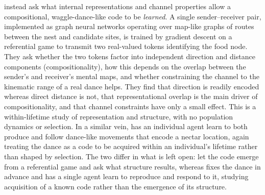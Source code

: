 \documentclass[11pt]{article}
\begin{document}
\citet{siregar2026emergent} instead ask what internal representations and
channel properties allow a compositional, waggle-dance-like code to be
\emph{learned}. A single sender--receiver pair, implemented as graph neural
networks operating over map-like graphs of routes between the nest and candidate
sites, is trained by gradient descent on a referential game to transmit two
real-valued tokens identifying the food node. They ask whether the two tokens
factor into independent direction and distance components (compositionality),
how this depends on the overlap between the sender's and receiver's mental maps,
and whether constraining the channel to the kinematic range of a real dance
helps. They find that direction is readily encoded whereas direct distance is
not, that representational overlap is the main driver of compositionality, and
that channel constraints have only a small effect. This is a within-lifetime
study of representation and structure, with no population dynamics or selection.
In a similar vein, \citet{portegys2020morphognostic} has an individual agent
learn to both produce and follow dance-like movements that encode a nectar
location, again treating the dance as a code to be acquired within an
individual's lifetime rather than shaped by selection. The two differ in what is
left open: \citet{siregar2026emergent} let the code emerge from a referential
game and ask what structure results, whereas \citet{portegys2020morphognostic}
fixes the dance in advance and has a single agent learn to reproduce and respond
to it, studying acquisition of a known code rather than the emergence of its
structure.
\end{document}
